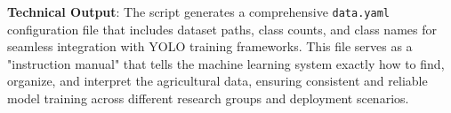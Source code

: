 \textbf{Technical Output}: The script generates a comprehensive \texttt{data.yaml} configuration file that includes dataset paths, class counts, and class names for seamless integration with YOLO training frameworks. This file serves as a "instruction manual" that tells the machine learning system exactly how to find, organize, and interpret the agricultural data, ensuring consistent and reliable model training across different research groups and deployment scenarios.
